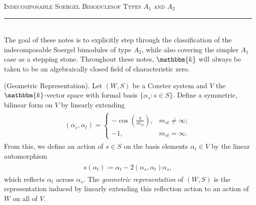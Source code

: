 



\thispagestyle{fancy}

\begin{center}
\LARGE\scshape Indecomposable Soergel Bimodules\linebreak of Types $A_1$ and $A_2$\noindent\\[-\linespacing]
\rule{0.75\linewidth}{1pt}
\end{center}
\noindent\\[-0.75\linespacing]


\noindent The goal of these notes is to explicitly step through the classification of the indecomposable Soergel bimodules of type $A_2$, while also covering the simpler $A_1$ case as a stepping stone. Throughout these notes, $\mathbbm{k}$ will always be taken to be an algebraically closed field of characteristic zero.\\

\noindent\begin{definition}\label{GeometricRepresentation}\textup{(Geometric Representation).} Let $(W, S)$ be a Coxeter system and $V$ the $\mathbbm{k}$-vector space with formal basis $\{\alpha_s : s \in S\}$. Define a symmetric, bilinear form on $V$ by linearly extending
\begin{align*}
\begin{split}
(\alpha_s, \alpha_t) = \begin{cases}-\cos\!\left(\frac{\pi}{m_{st}}\right)\!,&m_{st} \neq \infty;\\-1,&m_{st} = \infty.\end{cases}
\end{split}
\end{align*}
\noindent From this, we define an action of $s \in S$ on the basis elements $\alpha_t \in V$ by the linear automorphism
\begin{align*}
\begin{split}
s(\alpha_t) \coloneqq \alpha_t - 2(\alpha_s, \alpha_t)\alpha_s,
\end{split}
\end{align*}
\noindent which reflects $\alpha_t$ across $\alpha_s$. The {\em geometric representation} of $(W, S)$ is the representation induced by linearly extending this reflection action to an action of $W$ on all of $V$.\\
\end{definition}

